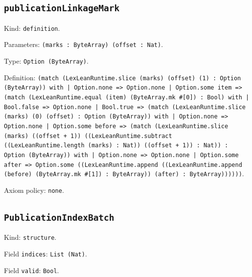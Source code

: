 \documentclass[11pt]{article}
\begin{document}
\subsection*{\texttt{publicationLinkageMark}}
\noindent Kind: \texttt{definition}.\par
\noindent Parameters: \texttt{(marks : ByteArray) (offset : Nat)}.\par
\noindent Type: \texttt{Option (ByteArray)}.\par
\noindent Definition: \texttt{(match (LexLeanRuntime.slice (marks) (offset) (1) : Option (ByteArray)) with | Option.none => Option.none | Option.some item => (match (LexLeanRuntime.equal (item) (ByteArray.mk \#[0]) : Bool) with | Bool.false => Option.none | Bool.true => (match (LexLeanRuntime.slice (marks) (0) (offset) : Option (ByteArray)) with | Option.none => Option.none | Option.some before => (match (LexLeanRuntime.slice (marks) ((offset + 1)) ((LexLeanRuntime.subtract ((LexLeanRuntime.length (marks) : Nat)) ((offset + 1)) : Nat)) : Option (ByteArray)) with | Option.none => Option.none | Option.some after => Option.some ((LexLeanRuntime.append ((LexLeanRuntime.append (before) (ByteArray.mk \#[1]) : ByteArray)) (after) : ByteArray))))))}.\par
\noindent Axiom policy: \texttt{none}.\par
\subsection*{\texttt{PublicationIndexBatch}}
\noindent Kind: \texttt{structure}.\par
\noindent Field \texttt{indices}: \texttt{List (Nat)}.\par
\noindent Field \texttt{valid}: \texttt{Bool}.\par
\end{document}

